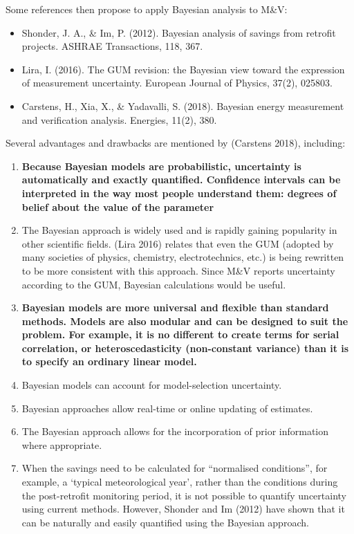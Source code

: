 \documentclass[
]{article}
\providecommand{\tightlist}{%
  \setlength{\itemsep}{0pt}\setlength{\parskip}{0pt}}
\begin{document}
Some references then propose to apply Bayesian analysis to M\&V:

\begin{itemize}
\tightlist
\item
  Shonder, J. A., \& Im, P. (2012). Bayesian analysis of savings from retrofit projects. ASHRAE Transactions, 118, 367.
\item
  Lira, I. (2016). The GUM revision: the Bayesian view toward the expression of measurement uncertainty. European Journal of Physics, 37(2), 025803.
\item
  Carstens, H., Xia, X., \& Yadavalli, S. (2018). Bayesian energy measurement and verification analysis. Energies, 11(2), 380.
\end{itemize}

Several advantages and drawbacks are mentioned by (Carstens 2018), including:

\begin{enumerate}
\def\labelenumi{\arabic{enumi}.}
\tightlist
\item
  \textbf{Because Bayesian models are probabilistic, uncertainty is automatically and exactly quantified. Confidence intervals can be interpreted in the way most people understand them: degrees of belief about the value of the parameter}
\item
  The Bayesian approach is widely used and is rapidly gaining popularity in other scientific fields. (Lira 2016) relates that even the GUM (adopted by many societies of physics, chemistry, electrotechnics, etc.) is being rewritten to be more consistent with this approach. Since M\&V reports uncertainty according to the GUM, Bayesian calculations would be useful.
\item
  \textbf{Bayesian models are more universal and flexible than standard methods. Models are also modular and can be designed to suit the problem. For example, it is no different to create terms for serial correlation, or heteroscedasticity (non-constant variance) than it is to specify an ordinary linear model.}
\item
  Bayesian models can account for model-selection uncertainty.
\item
  Bayesian approaches allow real-time or online updating of estimates.
\item
  The Bayesian approach allows for the incorporation of prior information where appropriate.
\item
  When the savings need to be calculated for ``normalised conditions'', for example, a `typical meteorological year', rather than the conditions during the post-retrofit monitoring period, it is not possible to quantify uncertainty using current methods. However, Shonder and Im (2012) have shown that it can be naturally and easily quantified using the Bayesian approach.
\end{enumerate}
\end{document}
